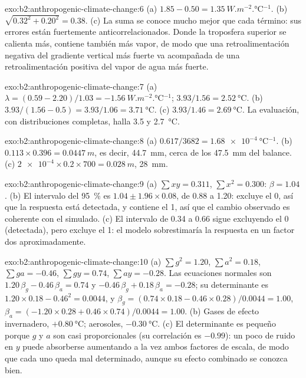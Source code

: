 \begin{solution}{exo:b2:anthropogenic-climate-change:6}
(a) $1.85 - 0.50 = \qty{1.35}{W.m^{-2}.\celsius^{-1}}$. (b) $\sqrt{0.32^2 + 0.20^2} = 0.38$.
(c) La suma se conoce mucho mejor que cada término: sus errores están fuertemente anticorrelacionados. Donde
la troposfera superior se calienta más, contiene también más vapor, de modo que una retroalimentación negativa del gradiente vertical más fuerte
va acompañada de una retroalimentación positiva del vapor de agua más fuerte.
\end{solution}

\begin{solution}{exo:b2:anthropogenic-climate-change:7}
(a) $\lambda = (0.59 - 2.20)/1.03 = \qty{-1.56}{W.m^{-2}.\celsius^{-1}}$; $3.93/1.56 =
\qty{2.52}{\celsius}$. (b) $3.93/(1.56 - 0.5) = 3.93/1.06 = \qty{3.71}{\celsius}$. (c) $3.93/1.46 =
\qty{2.69}{\celsius}$. La evaluación, con distribuciones completas, halla 3.5 y \qty{2.7}{\celsius}.
\end{solution}

\begin{solution}{exo:b2:anthropogenic-climate-change:8}
(a) $0.617/3682 = \qty{1.68e-4}{\celsius^{-1}}$. (b) $0.113 \times 0.396 = \qty{0.0447}{m}$, es decir,
\qty{44.7}{mm}, cerca de los \qty{47.5}{mm} del balance. (c) $\num{2e-4} \times 0.2 \times 700 =
\qty{0.028}{m}$, \qty{28}{mm}.
\end{solution}

\begin{solution}{exo:b2:anthropogenic-climate-change:9}
(a) $\sum xy = 0.311$, $\sum x^2 = 0.300$: $\beta = 1.04$. (b) El intervalo del \qty{95}{\percent} es
$1.04 \pm 1.96 \times 0.08$, de 0.88 a 1.20: excluye el 0, así que la respuesta está detectada, y contiene el
1, así que el cambio observado es coherente con el simulado. (c) El intervalo de 0.34 a 0.66 sigue
excluyendo el 0 (detectada), pero excluye el 1: el modelo sobrestimaría la respuesta en un factor dos
aproximadamente.
\end{solution}

\begin{solution}{exo:b2:anthropogenic-climate-change:10}
(a) $\sum g^2 = 1.20$, $\sum a^2 = 0.18$, $\sum ga = -0.46$, $\sum gy = 0.74$, $\sum ay = -0.28$.
Las ecuaciones normales son $1.20\,\beta_g - 0.46\,\beta_a = 0.74$ y $-0.46\,\beta_g + 0.18\,\beta_a
= -0.28$; su determinante es $1.20 \times 0.18 - 0.46^2 = 0.0044$, y $\beta_g = (0.74 \times
0.18 - 0.46 \times 0.28)/0.0044 = 1.00$, $\beta_a = (-1.20 \times 0.28 + 0.46 \times 0.74)/0.0044 =
1.00$. (b) Gases de efecto invernadero, $+\qty{0.80}{\celsius}$; aerosoles, $-\qty{0.30}{\celsius}$. (c) El
determinante es pequeño porque $g$ y $a$ son casi proporcionales (su correlación es $-0.99$): un
poco de ruido en $y$ puede absorberse aumentando a la vez ambos factores de escala, de modo que cada uno queda mal
determinado, aunque su efecto combinado se conozca bien.
\end{solution}


